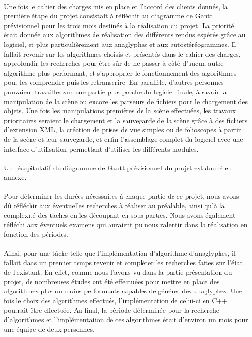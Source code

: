 \paragraph{}
Une fois le cahier des charges mis en place et l'accord des clients donnés, la première étape du projet consistait à réfléchir au diagramme de Gantt prévisionnel pour les trois mois destinés à la réalisation du projet.
La priorité était donnée aux algorithmes de réalisation des différents rendus espérés grâce au logiciel, et plus particulièrement aux anaglyphes et aux autostéréogrammes. Il fallait revenir sur les algorithmes choisis et présentés dans le cahier des charges, approfondir les recherches pour être sûr de ne passer à côté d'aucun autre algorithme plus performant, et s'approprier le fonctionnement des algorithmes pour les comprendre puis les retranscrire.
En parallèle, d'autres personnes pouvaient travailler sur une partie plus proche du logiciel finale, à savoir la manipulation de la scène ou encore les parseurs de fichiers pour le chargement des objets.
Une fois les manipulations premières de la scène effectuées, les travaux prioritaires seraient le chargement et la sauvegarde de la scène grâce à des fichiers d'extension XML, la création de prises de vue simples ou de folioscopes à partir de la scène et leur sauvegarde, et enfin l'assemblage complet du logiciel avec une interface d'utilisation permettant d'utiliser les différents modules.

\paragraph{}
Un récapitulatif du diagramme de Gantt prévisionnel du projet est donné en annexe.

\paragraph{}
Pour déterminer les durées nécessaires à chaque partie de ce projet, nous avons dû réfléchir aux éventuelles recherches à réaliser au préalable, ainsi qu'à la complexité des tâches en les découpant en sous-parties. Nous avons également réfléchi aux éventuels examens qui auraient pu nous ralentir dans la réalisation en fonction des périodes.

\paragraph{}
Ainsi, pour une tâche telle que l'implémentation d'algorithme d'anaglyphes, il fallait dans un premier temps revenir et compléter les recherches faites sur l'état de l'existant. En effet, comme nous l'avons vu dans la partie présentation du projet, de nombreuses études ont été effectuées pour mettre en place des algorithmes plus ou moins performants capables de générer des anaglyphes. Une fois le choix des algorithmes effectués, l'implémentation de celui-ci en C++ pourrait être effectuée.
Au final, la période déterminée pour la recherche d'algorithmes et l'implémentation de ces algorithmes était d'environ un mois pour une équipe de deux personnes.

